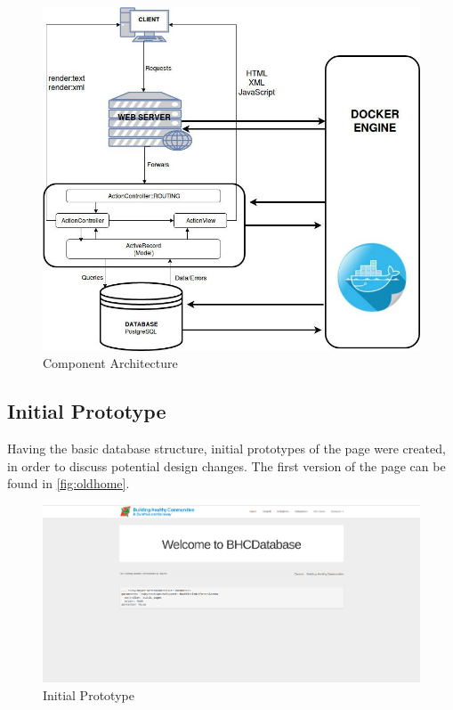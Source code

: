 \documentclass{l3proj}
\begin{document}
\begin{figure}[ht]
\centerline{\includegraphics[width=\textwidth, height=\textheight, keepaspectratio]{component.png}}
\caption{Component Architecture}
\label{fig:ca}
\end{figure}

\subsection{Initial Prototype}
\label{sec:prototype1}

Having the basic database structure, initial prototypes of the page were created, in order to discuss potential design changes. The first version of the page can be found in \autoref{fig:oldhome}.

\begin{figure}[ht]
\centerline{\includegraphics[width=\textwidth, height=\textheight, keepaspectratio]{oldhome.png}}
\caption{Initial Prototype}
\label{fig:oldhome}
\end{figure}
\end{document}
